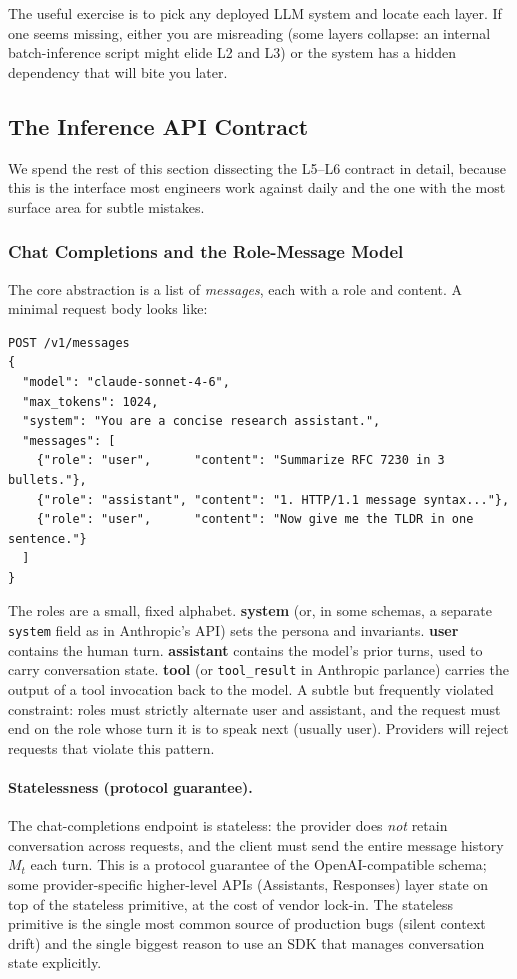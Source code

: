 The useful exercise is to pick any deployed LLM system and locate
each layer. If one seems missing, either you are misreading (some
layers collapse: an internal batch-inference script might elide
L2 and L3) or the system has a hidden dependency that will bite
you later.

\subsection{The Inference API Contract}

We spend the rest of this section dissecting the L5--L6 contract
in detail, because this is the interface most engineers work
against daily and the one with the most surface area for subtle
mistakes.

\subsubsection{Chat Completions and the Role-Message Model}

The core abstraction is a list of \emph{messages}, each with a
role and content. A minimal request body looks like:

\begin{lstlisting}
POST /v1/messages
{
  "model": "claude-sonnet-4-6",
  "max_tokens": 1024,
  "system": "You are a concise research assistant.",
  "messages": [
    {"role": "user",      "content": "Summarize RFC 7230 in 3 bullets."},
    {"role": "assistant", "content": "1. HTTP/1.1 message syntax..."},
    {"role": "user",      "content": "Now give me the TLDR in one sentence."}
  ]
}
\end{lstlisting}

The roles are a small, fixed alphabet. \textbf{system} (or, in
some schemas, a separate \texttt{system} field as in Anthropic's
API) sets the persona and invariants. \textbf{user} contains the
human turn. \textbf{assistant} contains the model's prior turns,
used to carry conversation state. \textbf{tool} (or
\texttt{tool\_result} in Anthropic parlance) carries the output
of a tool invocation back to the model. A subtle but frequently
violated constraint: roles must strictly alternate user and
assistant, and the request must end on the role whose turn it is
to speak next (usually user). Providers will reject requests that
violate this pattern.

\paragraph{Statelessness (protocol guarantee).}
The chat-completions endpoint is stateless: the provider does
\emph{not} retain conversation across requests, and the client
must send the entire message history $M_t$ each turn. This is a
protocol guarantee of the OpenAI-compatible schema; some
provider-specific higher-level APIs (Assistants, Responses) layer
state on top of the stateless primitive, at the cost of vendor
lock-in. The stateless primitive is the single most common source
of production bugs (silent context drift) and the single biggest
reason to use an SDK that manages conversation state explicitly.

